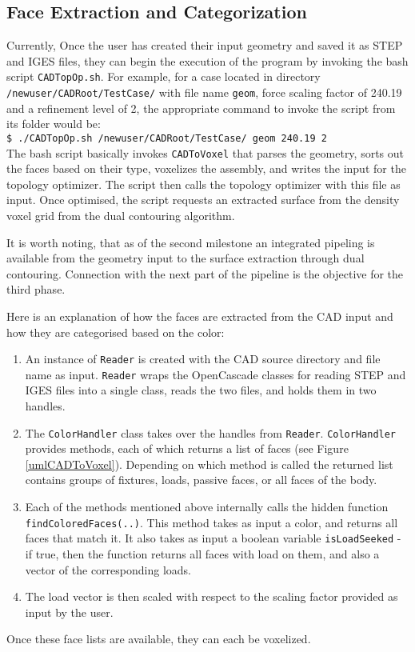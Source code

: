 \subsection{Face Extraction and Categorization}
\label{sec: FaceExtraction}


Currently, Once the user has created their input geometry and saved it as STEP and IGES files, they can begin the execution of the program by invoking the bash script \lstinline|CADTopOp.sh|. For example, for a case located in directory \lstinline|/newuser/CADRoot/TestCase/| with file name \lstinline|geom|, force scaling factor of 240.19 and a refinement level of 2, the appropriate command to invoke the script from its folder would be: \\

\lstinline|$ ./CADTopOp.sh /newuser/CADRoot/TestCase/ geom 240.19 2| \\

The bash script basically invokes \lstinline|CADToVoxel| that parses the geometry, sorts out the faces based on their type, voxelizes the assembly, and writes the input for the topology optimizer. The script then calls the topology optimizer with this file as input. Once optimised, the script requests an extracted surface from the density voxel grid from the dual contouring algorithm. 

It is worth noting, that as of the second milestone an integrated pipeling is available from the geometry input to the surface extraction through dual contouring. Connection with the next part of the pipeline is the objective for the third phase.

Here is an explanation of how the faces are extracted from the CAD input and how they are categorised based on the color:

\begin{enumerate}
	\item An instance of \lstinline|Reader| is created with the CAD source directory and file name as input. \lstinline|Reader| wraps the OpenCascade classes for reading STEP and IGES files into a single class, reads the two files, and holds them in two handles.
	\item The \lstinline|ColorHandler| class takes over the handles from \lstinline|Reader|. \lstinline|ColorHandler| provides methods, each of which returns a list of faces (see Figure \ref{umlCADToVoxel}). Depending on which method is called the returned list contains groups of fixtures, loads, passive faces, or all faces of the body.
	\item Each of the methods mentioned above internally calls the hidden function \lstinline|findColoredFaces(..)|. This method takes as input a color, and returns all faces that match it. It also takes as input a boolean variable \lstinline|isLoadSeeked| - if true, then the function returns all faces with load on them, and also a vector of the corresponding loads.
	\item The load vector is then scaled with respect to the scaling factor provided as input by the user.
\end{enumerate}

Once these face lists are available, they can each be voxelized.
